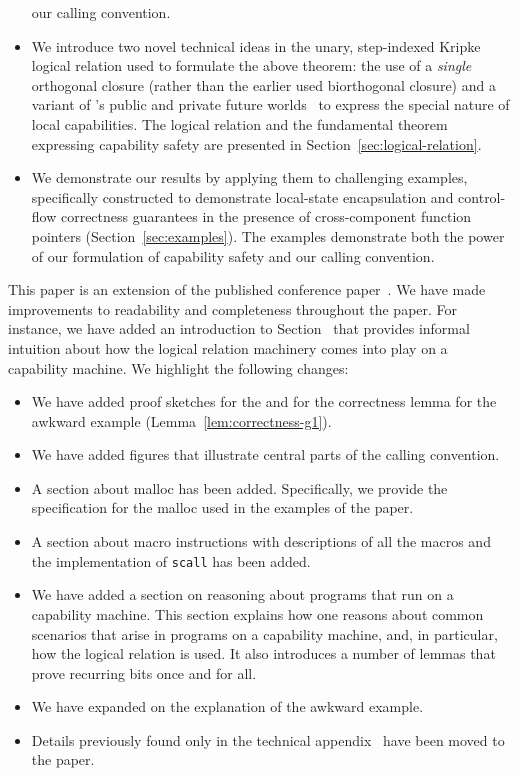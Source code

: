 \documentclass[format=acmsmall, review=true, screen=true]{acmart}
\renewcommand{\sectionname}{Section}
\newcommand\lau[1]{{\color{purple} \sf \footnotesize {LS: #1}}\\}
\renewcommand\lau[1]{}
\newenvironment{toplas}{}{}
\begin{document}
\begin{itemize}
  our calling convention.
\item We introduce two novel technical ideas in the unary, step-indexed Kripke
  logical relation used to formulate the above theorem: the use of a
  \emph{single} orthogonal closure (rather than the earlier used biorthogonal
  closure) and a variant of \citet{Dreyer:jfp12}'s public and private future
  worlds~\citep{Dreyer:jfp12} to express the special nature of local
  capabilities. The logical relation and the fundamental theorem expressing
  capability safety are presented in \sectionname~\ref{sec:logical-relation}.
\item We demonstrate our results by applying them to challenging examples,
  specifically constructed to demonstrate local-state encapsulation and
  control-flow correctness guarantees in the presence of cross-component
  function pointers (\sectionname~\ref{sec:examples}). The examples demonstrate both
  the power of our formulation of capability safety and our calling convention.
\end{itemize}
\begin{toplas}
  This paper is an extension of the published conference paper~\citet{Skorstengaard:esop18}.
  We have made improvements to readability and completeness throughout the paper.
  For instance, we have added an introduction to \sectionname~ that provides informal intuition about how the logical relation machinery comes into play on a capability machine.
  We highlight the following changes:
  \begin{itemize}
  \item We have added proof sketches for the  and for the correctness lemma for the awkward example
    (Lemma~\ref{lem:correctness-g1}).
  \item We have added figures that illustrate central parts of the calling convention.
  \item A section about malloc has been added.
    Specifically, we provide the specification for the malloc used in the examples of the paper.
  \item A section about macro instructions with descriptions of all the macros and the implementation of \texttt{scall} has been added.
  \item We have added a section on reasoning about programs that run on a capability machine.
    This section explains how one reasons about common scenarios that arise in programs on a capability machine, and, in particular, how the logical relation is used.
    It also introduces a number of lemmas that prove recurring bits once and for all.
  \item We have expanded on the explanation of the awkward example. 
  \item Details previously found only in the technical appendix~\citep{technical_appendix} have been moved to the paper.
\end{itemize}
\end{toplas}
\end{document}

